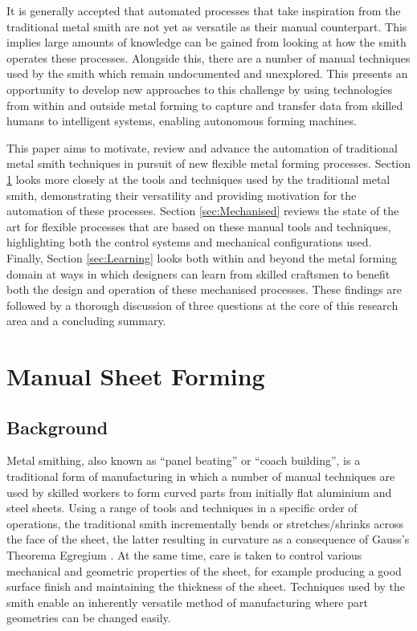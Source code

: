 It is generally accepted that automated processes that take inspiration from the traditional metal smith are not yet as versatile as their manual counterpart.  This implies large amounts of knowledge can be gained from looking at how the smith operates these processes. Alongside this, there are a number of manual techniques used by the smith which remain undocumented and unexplored. This presents an opportunity to develop new approaches to this challenge by using technologies from within and outside metal forming to capture and transfer data from skilled humans to intelligent systems, enabling autonomous forming machines.

This paper aims to motivate, review and advance the automation of traditional metal smith techniques in pursuit of new flexible metal forming processes. Section \ref{sec:Manual} looks more closely at the tools and techniques used by the traditional metal smith, demonstrating their versatility and providing motivation for the automation of these processes. Section \ref{sec:Mechanised} reviews the state of the art for flexible processes that are based on these manual tools and techniques, highlighting both the control systems and mechanical configurations used. Finally, Section \ref{sec:Learning} looks both within and beyond the metal forming domain at ways in which designers can learn from skilled craftsmen to benefit both the design and operation of these mechanised processes. These findings are followed by a thorough discussion of three questions at the core of this research area and a concluding summary. 

\section{Manual Sheet Forming}\label{sec:Manual}
\subsection{Background}\label{sec:ManualBackground}
Metal smithing, also known as ``panel beating'' or ``coach building'', is a traditional form of manufacturing in which a number of manual techniques are used by skilled workers to form curved parts from initially flat aluminium and steel sheets. Using a range of tools and techniques in a specific order of operations, the traditional smith incrementally bends or stretches/shrinks across the face of the sheet, the latter resulting in curvature as a consequence of Gauss's Theorema Egregium \citep{Pressley2001ElementaryGeometry}. At the same time, care is taken to control various mechanical and geometric properties of the sheet, for example producing a good surface finish and maintaining the thickness of the sheet.%
Techniques used by the smith enable an inherently versatile method of manufacturing where part geometries can be changed easily.

